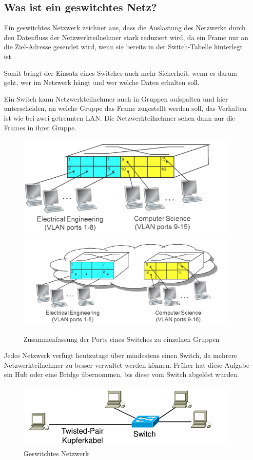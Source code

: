 \subsection{Was ist ein geswitchtes Netz?}
\label{sec:geswitchtes_netz}
Ein geswitchtes Netzwerk zeichnet aus, dass die Auslastung des Netzwerke durch den Datenfluss der Netzwerkteilnehmer stark reduziert wird, da ein Frame nur an die Ziel-Adresse gesendet wird, wenn sie bereits in der Switch-Tabelle hinterlegt ist.

Somit bringt der Einsatz eines Switches auch mehr Sicherheit, wenn es darum geht, wer im Netzwerk hängt und wer welche Daten erhalten soll.

Ein Switch kann Netzwerkteilnehmer auch in Gruppen aufspalten und hier unterscheiden, an welche Gruppe das Frame zugestellt werden soll, das Verhalten ist wie bei zwei getrennten LAN.
Die Netzwerkteilnehmer sehen dann nur die Frames in ihrer Gruppe.

\begin{figure}[H]
	\centering
	\includegraphics[width=0.7\linewidth]{images/VLAN_1.png}
	\includegraphics[width=0.8\linewidth]{images/VLAN_2.png}
	\caption{Zusammenfassung der Ports eines Switches zu einzelnen Gruppen \cite[Kapitel 5, Abbildung Folie 41]{netzwerkeI}}
\end{figure}

Jedes Netzwerk verfügt heutzutage über mindestens einen Switch, da mehrere Netzwerkteilnehmer zu besser verwaltet werden können.
Früher hat diese Aufgabe ein Hub oder eine Bridge übernommen, bis diese vom Switch abgelöst wurden.
\begin{figure}[H]
	\centering
	\includegraphics[width=1\linewidth]{images/geswitchtes_netz.png}
	\caption{Geswitchtes Netzwerk \cite[Kapitel 5, Abbildung Folie 33]{netzwerkeI}}
\end{figure}
